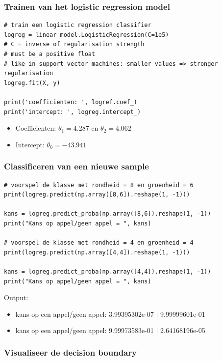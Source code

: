 \documentclass{article}
\begin{document}
\subsubsection{Trainen van het logistic regression model}

\begin{verbatim}
# train een logistic regression classifier
logreg = linear_model.LogisticRegression(C=1e5)
# C = inverse of regularisation strength
# must be a positive float
# like in support vector machines: smaller values => stronger regularisation
logreg.fit(X, y)

print('coefficienten: ', logref.coef_)
print('intercept: ', logreg.intercept_)

\end{verbatim}

\begin{itemize}
    \item Coefficienten: $\theta_1 = 4.287$ en $\theta_2 = 4.062$
    \item Intercept: $\theta_0 = -43.941$
\end{itemize}

\subsubsection{Classificeren van een nieuwe sample}

\begin{verbatim}
# voorspel de klasse met rondheid = 8 en groenheid = 6
print(logreg.predict(np.array([8,6]).reshape(1, -1)))

kans = logreg.predict_proba(np.array([8,6]).reshape(1, -1))
print("Kans op appel/geen appel = ", kans)

# voorspel de klasse met rondheid = 4 en groenheid = 4
print(logreg.predict(np.array([4,4]).reshape(1, -1)))

kans = logreg.predict_proba(np.array([4,4]).reshape(1, -1))
print("Kans op appel/geen appel = ", kans)
\end{verbatim}

Output:

\begin{itemize}
    \item kans op een appel/geen appel: 3.99395302e-07 | 9.99999601e-01
    \item kans op een appel/geen appel: 9.99973583e-01 | 2.64168196e-05
\end{itemize}

\subsubsection{Visualiseer de decision boundary}
\end{document}
